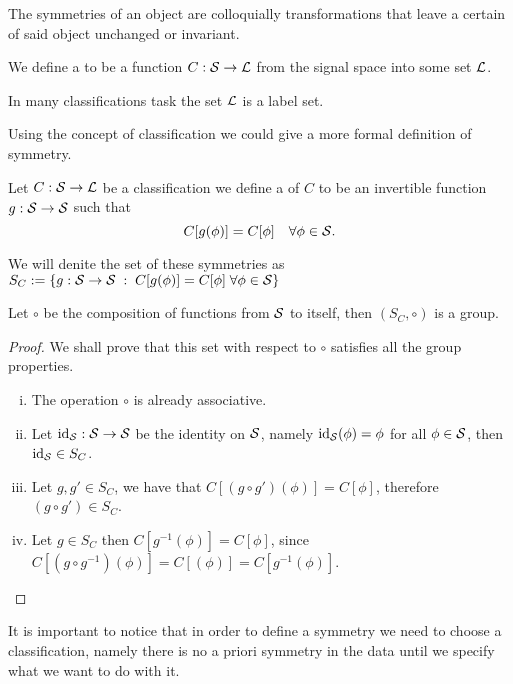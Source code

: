 \documentclass[../3.tex]{subfiles}
\begin{document}
    The symmetries of an object are colloquially transformations that leave
    a certain  of said object unchanged or invariant. 

    \begin{defn}
        We define a  to be a function $C : \mathcal{S} \to \mathcal{L}$ from the signal space into some set $\mathcal{L}$.
    \end{defn}

    In many classifications task the set $\mathcal{L}$ is a label set.

    Using the concept of classification we could give a more formal definition of symmetry.

    \begin{defn}
        Let $C : \mathcal{S} \to \mathcal{L}$ be a classification we define a  of $C$ to be an invertible function
        $g : \mathcal{S} \to \mathcal{S}$ such that 
        \[ C[g(\phi)] = C[\phi] \quad \forall \phi \in \mathcal{S}. \]
    \end{defn}

    We will denite the set of these symmetries as $S_C := \{ g : \mathcal{S} \to \mathcal{S} \; : \; C[g(\phi)] = C[\phi] \;  \forall \phi \in \mathcal{S}\}$

    \begin{prop}
        Let $\circ$ be the composition of functions from $\mathcal{S}$ to itself, then $(S_C, \circ)$ is a group.
    \end{prop} 
    \begin{proof}
        We shall prove that this set with respect to $\circ$ satisfies all the group properties.
        \begin{enumerate}[(i)]
            \item The operation $\circ$ is already associative.
            \item Let $\text{id}_{\mathcal{S}} : \mathcal{S} \to \mathcal{S}$ be the identity on $\mathcal{S}$, namely $\text{id}_{\mathcal{S}}(\phi) = \phi$ for all $\phi \in \mathcal{S}$,
                then $\text{id}_{\mathcal{S}} \in S_C$.
            \item Let $g,g' \in S_C$, we have that $C[(g\circ g')(\phi)] = C[\phi]$, therefore $(g \circ g') \in S_C$.
            \item Let $g \in S_C$ then $C[g^{-1}(\phi)] = C[\phi]$, since $C[(g \circ g^{-1})(\phi)] = C[(\phi)] = C[g^{-1}(\phi)]$. \qedhere
        \end{enumerate}
    \end{proof}

    It is important to notice that in order to define a symmetry we need to choose a classification, namely there is no a priori symmetry in the data until
    we specify what we want to do with it.\\
\end{document}
